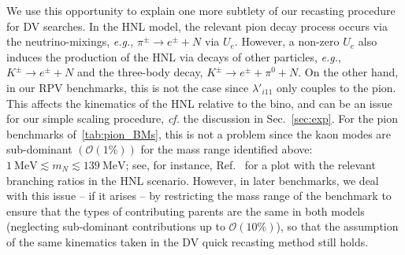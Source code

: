 We use this opportunity to explain one more subtlety of our recasting procedure for DV searches. In the HNL model, the relevant pion decay process occurs via the neutrino-mixings, 
\textit{e.g.}, $\pi^\pm \to e^\pm + N$ via $U_e$. However, a non-zero $U_e$ also induces 
the production of the HNL via decays of other particles, \textit{e.g.}, $K^\pm \to e^\pm 
+ N$ and the three-body decay, $K^\pm \to e^\pm + \pi^0 + N$. On the other hand, in our RPV 
benchmarks, this is not the case since $\lambda'_{i11}$ only couples to the pion. This affects
the kinematics of the HNL relative to the bino, and can be an issue for our simple scaling 
procedure, \textit{cf.} the discussion in Sec.~\ref{sec:exp}. For the pion benchmarks 
of~\cref{tab:pion_BMs}, this is not a problem since the kaon modes are sub-dominant $\left(
\mathcal{O}(1\%)\right)$ for the mass range identified above: $\SI{1}{\MeV} \lesssim m_N \lesssim 
\SI{139}{\MeV}$; see, for instance, Ref.~\cite{Berryman:2019dme} for a plot with the relevant 
branching ratios in the HNL scenario. However, in later benchmarks, we deal with this issue 
-- if it arises -- by restricting the mass range of the benchmark to ensure that the types of 
contributing parents are the same in both models (neglecting sub-dominant contributions up to 
$\mathcal{O}(10\%)$), so that the assumption of the same kinematics taken in the DV quick 
recasting method still holds. 

